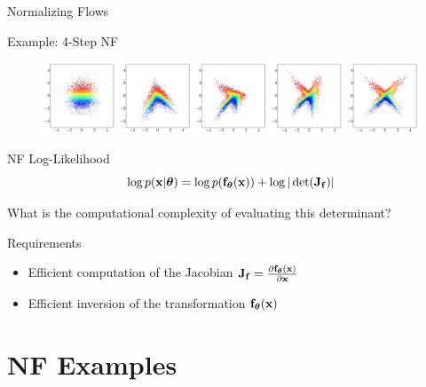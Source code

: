 \documentclass{beamer}
\begin{document}
\begin{frame}{Normalizing Flows}
	\begin{block}{Example: 4-Step NF}
		\vspace{-0.2cm}
		\begin{figure}
			\includegraphics[width=\linewidth]{figs/flow_4_steps_example.png}
		\end{figure}
	\end{block}
	\vspace{-0.5cm}
	\begin{block}{NF Log-Likelihood}
		\vspace{-0.3cm}
		\[
		\log p(\mathbf{x}|\boldsymbol{\theta}) = \log p(\mathbf{f}_{\boldsymbol{\theta}}(\mathbf{x})) + \log |\det ( \mathbf{J}_{\mathbf{f}})|
		\]
		\vspace{-0.3cm}
	\end{block}
	What is the computational complexity of evaluating this determinant?
	\begin{block}{Requirements}
		\begin{itemize}
			\item Efficient computation of the Jacobian $\mathbf{J}_{\mathbf{f}} = \frac{\partial \mathbf{f}_{\boldsymbol{\theta}}(\mathbf{x})}{\partial \mathbf{x}}$
			\item Efficient inversion of the transformation $\mathbf{f}_{\boldsymbol{\theta}}(\mathbf{x})$
		\end{itemize}
	\end{block}
\end{frame}
\section{NF Examples}
\end{document}
